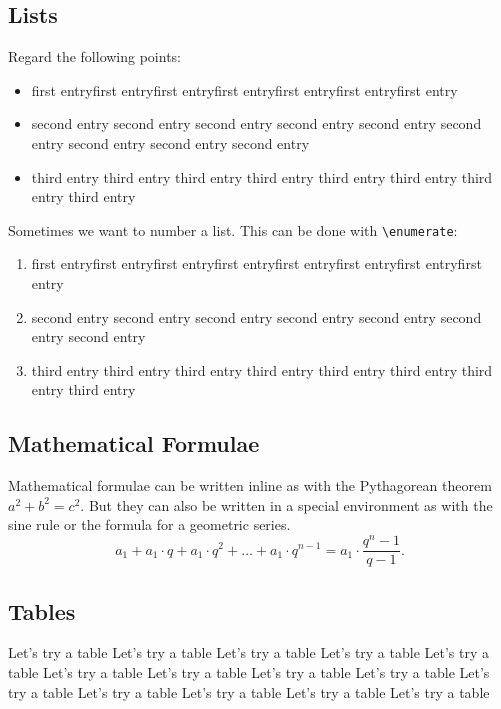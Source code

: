 \documentclass[12pt,a4paper]{article} %
\begin{document}
\subsection{Lists}

Regard the following points:

\begin{itemize}
\item first entryfirst entryfirst entryfirst entryfirst entryfirst entryfirst entry
\item second entry second entry second entry second entry second entry second entry second entry second entry second entry 

\item third entry third entry third entry third entry third entry third entry third entry third entry 
\end{itemize}

Sometimes we want to number a list. This can be done with \verb|\enumerate|:

\begin{enumerate}
\item first entryfirst entryfirst entryfirst entryfirst entryfirst entryfirst entryfirst entry
\item second entry second entry second entry second entry second entry second entry second entry 
\item third entry third entry third entry third entry third entry third entry third entry third entry 
\end{enumerate}

\subsection{Mathematical Formulae}
Mathematical formulae can be written inline as with the Pythagorean theorem $a^2+b^2=c^2$. But they can also be written in a special environment as with the sine rule
or the formula for a geometric series.
 \[
a_1+a_1\cdot q+a_1\cdot q^2+\ldots + a_1 \cdot q^{n-1}= a_1 \cdot\frac{q^n-1}{q-1}.
\]


\subsection{Tables}

Let's try a table Let's try a table Let's try a table Let's try a table Let's try a table Let's try a table Let's try a table Let's try a table Let's try a table Let's try a table Let's try a table Let's try a table Let's try a table Let's try a table 
\end{document}
